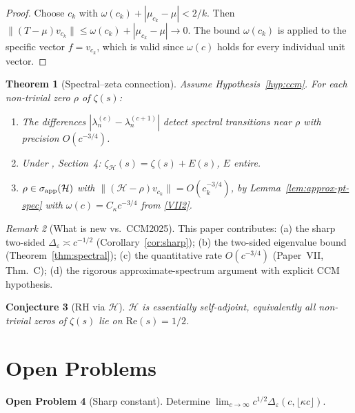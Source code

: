 \documentclass[12pt,a4paper]{amsart}
\newtheorem{theorem}{Theorem}[section]
\newtheorem{conjecture}[theorem]{Conjecture}
\theoremstyle{definition}
\newtheorem{problem}[theorem]{Open Problem}
\theoremstyle{remark}
\newtheorem{remark}[theorem]{Remark}
\newcommand{\Hlim}{\mathcal{H}}
\begin{document}
\begin{proof}
Choose $c_k$ with
$\omega(c_k)+|\mu_{c_k}-\mu|<2/k$.
Then
$\|(T-\mu)v_{c_k}\|
\le\omega(c_k)+|\mu_{c_k}-\mu|\to 0$.
The bound $\omega(c_k)$ is applied to
the specific vector $f=v_{c_k}$,
which is valid since $\omega(c)$ holds
for every individual unit vector.
\end{proof}

\begin{theorem}[Spectral--zeta connection]
\label{thm:zeta}
Assume Hypothesis~\ref{hyp:ccm}.
For each non-trivial zero $\rho$ of $\zeta(s)$:
\begin{enumerate}[\rm(i)]
\item The differences $|\lambda_n^{(c)}-\lambda_n^{(c+1)}|$
      detect spectral transitions near $\rho$
      with precision $O(c^{-3/4})$.
\item Under \cite{CCM2025}, Section~4:
      $\zeta_{\Hlim}(s)=\zeta(s)+E(s)$, $E$ entire.
\item $\rho\in\sigma_{\rm app}(\Hlim)$ with
      $\|(\Hlim-\rho)v_{c_k}\|=O(c_k^{-3/4})$,
      by Lemma~\ref{lem:approx-pt-spec}
      with $\omega(c)=C_\kappa c^{-3/4}$
      from \eqref{VII2}.
\end{enumerate}
\end{theorem}

\begin{remark}[What is new vs.\ CCM2025]
This paper contributes:
(a) the sharp two-sided
$\Delta_\varepsilon\asymp c^{-1/2}$
(Corollary~\ref{cor:sharp});
(b) the two-sided eigenvalue bound
(Theorem~\ref{thm:spectral});
(c) the quantitative rate $O(c^{-3/4})$
(Paper~VII, Thm.~C);
(d) the rigorous approximate-spectrum
argument with explicit CCM hypothesis.
\end{remark}

\begin{conjecture}[RH via $\Hlim$]
\label{conj:RH}
$\Hlim$ is essentially self-adjoint,
equivalently all non-trivial zeros of $\zeta(s)$
lie on $\mathrm{Re}(s)=1/2$.
\end{conjecture}

\section{Open Problems}
\label{sec:problems}

\begin{problem}[Sharp constant]
Determine
$\lim_{c\to\infty}c^{1/2}\Delta_\varepsilon
(c,\lfloor\kappa c\rfloor)$.
\end{problem}
\end{document}
